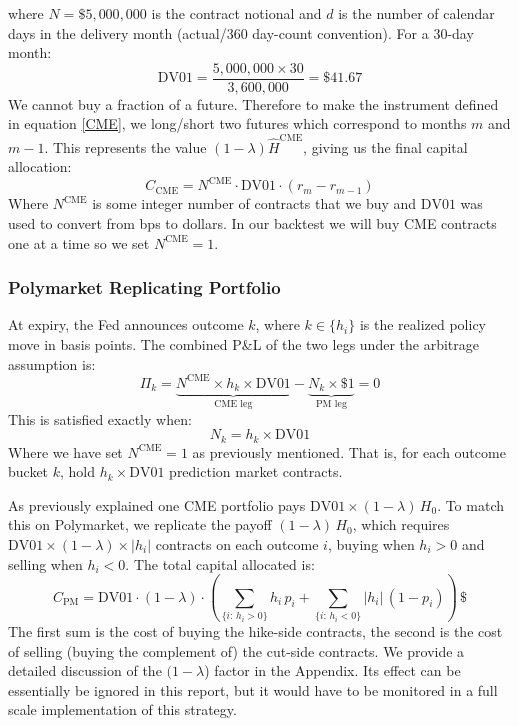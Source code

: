 where $N = \$5{,}000{,}000$ is the contract notional and $d$ is the number
of calendar days in the delivery month (actual/360 day-count convention).
For a 30-day month:
\begin{equation}
  \mathrm{DV01} = \frac{5{,}000{,}000 \times 30}{3{,}600{,}000}
               = \$41.67
\end{equation}
We cannot buy a fraction of a future. Therefore to make the instrument defined in equation \ref{CME}, we long/short two futures which correspond to months $m$ and $m-1$. This represents the value $(1-\lambda) \widehat{H}^{\mathrm{CME}}$, giving us the final capital allocation:
\begin{equation}
    C_{\text{CME}} = N^{\text{CME}} \cdot \mathrm{DV01} \cdot (r_m - r_{m-1})
\end{equation}
Where $N^{\text{CME}}$ is some integer number of contracts that we buy and $\mathrm{DV01}$ was used to convert from bps to dollars. In our backtest we will buy CME contracts one at a time so we set $N^{\text{CME}}=1$.

\subsubsection{Polymarket Replicating Portfolio}

At expiry, the Fed announces outcome $k$, where $k \in \{h_i\}$ is the realized policy move in basis points. The combined P\&L of the two legs under the arbitrage assumption is:
\begin{equation}
    \Pi_k = \underbrace{{N^{\text{CME}}} \times h_k \times \mathrm{DV01}}_{\text{CME leg}}
    - \underbrace{N_k \times \$1}_{\text{PM leg}}
    = 0
\end{equation}
This is satisfied exactly when:
\begin{equation}
    N_k = h_k \times \mathrm{DV01}
    \label{eq:arb_condition}
\end{equation}
Where we have set $N^{\text{CME}} =1$ as previously mentioned. That is, for each outcome bucket $k$, hold $h_k \times \mathrm{DV01}$ prediction market contracts. 

As previously explained one CME portfolio pays $\mathrm{DV01} \times (1-\lambda)\, H_0$. To match this on Polymarket,
we replicate the payoff $(1-\lambda)\,H_0$, which requires
$\mathrm{DV01} \times (1-\lambda) \times |h_i|$ contracts on each outcome $i$, buying when $h_i > 0$ and selling when $h_i < 0$. The total capital allocated is:
\begin{equation}
\label{Cpm}
  C_{\mathrm{PM}}
  = \mathrm{DV01}\cdot (1-\lambda) \cdot \left(
      \sum_{\{i:\, h_i > 0\}} h_i \, p_i
    + \sum_{\{i:\, h_i < 0\}} |h_i| \, (1 - p_i)
    \right) \, \$
\end{equation}
The first sum is the cost of buying the hike-side contracts,
the second is the cost of selling (buying the complement of)
the cut-side contracts. We provide a detailed discussion of the $(1-\lambda$) factor in the Appendix. Its effect can be essentially be ignored in this report, but it would have to be monitored in a full scale implementation of this strategy.

